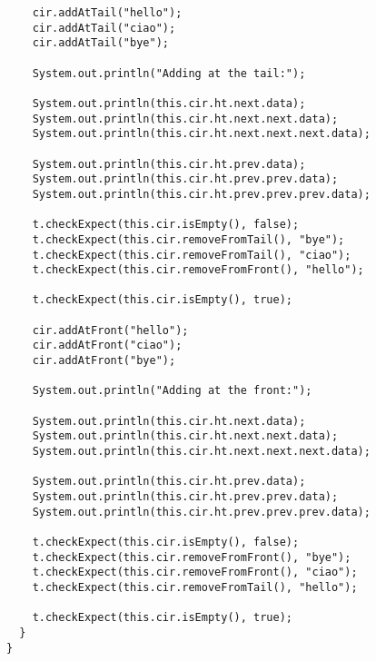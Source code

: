 \documentclass[11pt]{article}
\newcounter{Pctr}
\newenvironment{problem}{\stepcounter{Pctr}%
\begin{description}
\item[\noindent{\bf Problem} \arabic{Pctr}]
\end{description}}{\relax}
\begin{document}
\begin{problem}
\begin{enumerate}
\begin{verbatim}
    cir.addAtTail("hello");
    cir.addAtTail("ciao");
    cir.addAtTail("bye");
    
    System.out.println("Adding at the tail:");
    
    System.out.println(this.cir.ht.next.data);
    System.out.println(this.cir.ht.next.next.data);
    System.out.println(this.cir.ht.next.next.next.data);
    
    System.out.println(this.cir.ht.prev.data);
    System.out.println(this.cir.ht.prev.prev.data);
    System.out.println(this.cir.ht.prev.prev.prev.data);
    
    t.checkExpect(this.cir.isEmpty(), false);
    t.checkExpect(this.cir.removeFromTail(), "bye");
    t.checkExpect(this.cir.removeFromTail(), "ciao");
    t.checkExpect(this.cir.removeFromFront(), "hello");
    
    t.checkExpect(this.cir.isEmpty(), true);
    
    cir.addAtFront("hello");
    cir.addAtFront("ciao");
    cir.addAtFront("bye");

    System.out.println("Adding at the front:");
    
    System.out.println(this.cir.ht.next.data);
    System.out.println(this.cir.ht.next.next.data);
    System.out.println(this.cir.ht.next.next.next.data);
    
    System.out.println(this.cir.ht.prev.data);
    System.out.println(this.cir.ht.prev.prev.data);
    System.out.println(this.cir.ht.prev.prev.prev.data);
    
    t.checkExpect(this.cir.isEmpty(), false);
    t.checkExpect(this.cir.removeFromFront(), "bye");
    t.checkExpect(this.cir.removeFromFront(), "ciao");
    t.checkExpect(this.cir.removeFromTail(), "hello");
    
    t.checkExpect(this.cir.isEmpty(), true);
  }
}
\end{verbatim}
\endsol


\end{enumerate}
\end{problem}
\end{document}
